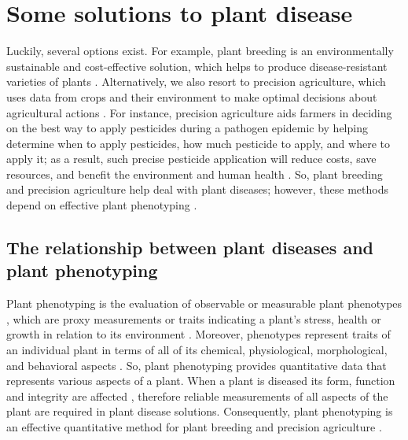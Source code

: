 \section{Some solutions to plant disease}
Luckily, several options exist. For example, plant breeding is an environmentally sustainable and cost-effective solution, which helps to produce disease-resistant varieties of plants \cite{anandBreedingTechniquesDispense2023, ortonIntroduction2020, heHighThroughputRoboticPhenotyping2025, furbankPhenomicsTechnologiesRelieve2011}. Alternatively, we also resort to precision agriculture, which uses data from crops and their environment to make optimal decisions about agricultural actions \cite{PrecisionAgricultureFood2025, PlantDiseaseDetection, cisternasSystematicLiteratureReview2020, yandunnarvaezSurveyRangingImaging2017}. For instance, precision agriculture aids farmers in deciding on the best way to apply pesticides during a pathogen epidemic \cite{bockPlantDiseaseSeverity2010} by helping determine when to apply pesticides, how much pesticide to apply, and where to apply it; as a result, such precise pesticide application will reduce costs, save resources, and benefit the environment and human health \cite{pathakCurrentStatusPesticide2022, reiser3DImagingSonar2017, khalidRealTimePlantHealth2023, qiaoEditorialAISensors2022, dechantAutomatedIdentificationNorthern2017, HelpingFarmersFace2025}. So, plant breeding and precision agriculture help deal with plant diseases; however, these methods depend on effective plant phenotyping \cite{fahlgrenVersatilePhenotypingSystem2015, furbankPhenomicsTechnologiesRelieve2011a, gehanPlantCVV2Image2017, zhangBOCNNBiLSTMDeepLearning2024, zhuDeepLearningbasedText2025a, anandBreedingTechniquesDispense2023}.

\subsection{The relationship between plant diseases and plant phenotyping}
Plant phenotyping is the evaluation of observable or measurable plant phenotypes \cite{fioraniFutureScenariosPlant2013, johannsenGenotypeConceptionHeredity1911a}, which are proxy measurements or traits indicating a plant's stress, health or growth in relation to its environment \cite{fioraniFutureScenariosPlant2013, liReviewImagingTechniques2014}. Moreover, phenotypes represent traits of an individual plant in terms of all of its chemical, physiological, morphological, and behavioral aspects \cite{guoPhenotypingPlants2014, mohammedReviewPlantPhenotyping2025, liReviewImagingTechniques2014}. So, plant phenotyping provides quantitative data that represents various aspects of a plant. When a plant is diseased its form, function and integrity are affected \cite{agriosINTRODUCTION2005}, therefore reliable measurements of all aspects of the plant are required in plant disease solutions. Consequently, plant phenotyping is an effective quantitative method for plant breeding and precision agriculture \cite{gehanPlantCVV2Image2017, wenThermalImagingDigital2023, dongPlantPADPlatformLargescale2024, mutkaImagebasedPhenotypingPlant2015a, anandBreedingTechniquesDispense2023}.

